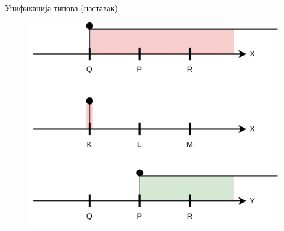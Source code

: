 \documentclass[xcolor=table]{beamer}
\begin{document}
\begin{frame}[allowframebreaks]{Унификација типова (наставак)}
        \framebreak
        
        \begin{figure}
            \centering
            \includegraphics[width=\textwidth,height=0.8\textheight,keepaspectratio]{images/unip3.png}
        \end{figure}
    \end{frame}
    
\end{document}
